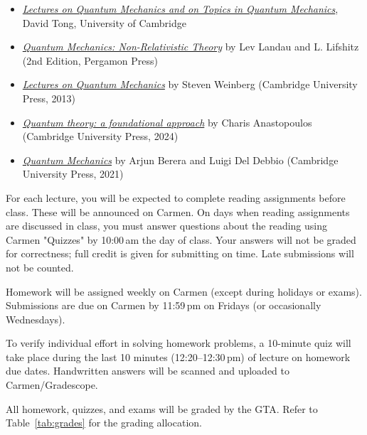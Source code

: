 \begin{itemize}
  \item \href{http://www.damtp.cam.ac.uk/user/tong/quantum.html}{\emph{Lectures on Quantum Mechanics and on Topics in Quantum Mechanics}}, David Tong, University of Cambridge
  \item \href{https://power1.pc.uec.ac.jp/~toru/notes/LandauLifshitz-QuantumMechanics.pdf}{\emph{Quantum Mechanics: Non-Relativistic Theory}} by Lev Landau and L. Lifshitz (2nd Edition, Pergamon Press)
  \item \href{https://www.cambridge.org/core/books/lectures-on-quantum-mechanics/F739B9577D2473995024FA5E9ABA9B6C}{\emph{Lectures on Quantum Mechanics}} by Steven Weinberg (Cambridge University Press, 2013)
  \item \href{https://www.cambridge.org/highereducation/books/quantum-theory/DCDC1557939E38C176EE7FF9334AB8D0#overview}{\emph{Quantum theory: a foundational approach}} by Charis Anastopoulos (Cambridge University Press, 2024)
  \item \href{https://doi.org/10.1017/9781108525848}{\emph{Quantum Mechanics}} by Arjun Berera and Luigi Del Debbio (Cambridge University Press, 2021)
\end{itemize}

For each lecture, you will be expected to complete reading assignments before class. These will be announced on Carmen. On days when reading assignments are discussed in class, you must answer questions about the reading using Carmen "Quizzes" by 10:00\,am the day of class. Your answers will not be graded for correctness; full credit is given for submitting on time. Late submissions will not be counted.

Homework will be assigned weekly on Carmen (except during holidays or exams). Submissions are due on Carmen by 11:59\,pm on Fridays (or occasionally Wednesdays).

To verify individual effort in solving homework problems, a 10-minute quiz will take place during the last 10 minutes (12:20--12:30\,pm) of lecture on homework due dates. Handwritten answers will be scanned and uploaded to Carmen/Gradescope.

All homework, quizzes, and exams will be graded by the GTA. Refer to Table~\ref{tab:grades} for the grading allocation.

